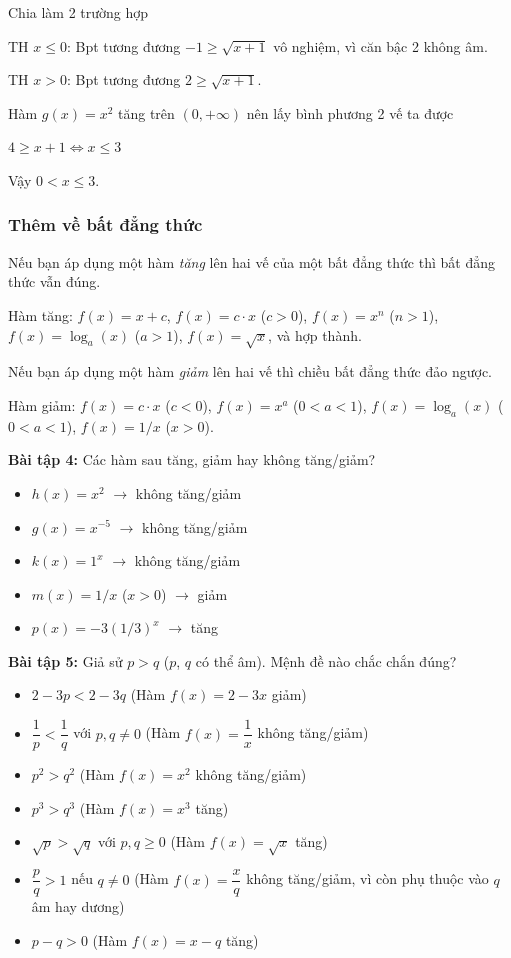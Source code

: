 \documentclass[12pt,a4paper]{article}
\begin{document}
Chia làm 2 trường hợp

TH $x \le 0$: Bpt tương đương $-1 \ge \sqrt{x + 1}$ vô nghiệm, vì căn bậc 2 không âm.

TH $x > 0$: Bpt tương đương $2 \ge \sqrt{x + 1}$.

Hàm $g(x) = x^2$ tăng trên $(0, +\infty)$ nên lấy bình phương 2 vế ta được

$4 \ge x + 1 \Leftrightarrow x \le 3$

Vậy $0 < x \le 3$.

\subsubsection*{Thêm về bất đẳng thức}

Nếu bạn áp dụng một hàm \emph{tăng} lên hai vế của một bất đẳng thức thì bất đẳng thức vẫn đúng.

Hàm tăng: $f(x) = x + c$, $f(x) = c\cdot x$ ($c > 0$), $f(x) = x^n$ ($n > 1$), $f(x) = \log_a(x)$ ($a > 1$), $f(x) = \sqrt{x}$, và hợp thành.

Nếu bạn áp dụng một hàm \emph{giảm} lên hai vế thì chiều bất đẳng thức đảo ngược.

Hàm giảm: $f(x) = c\cdot x$ ($c < 0$), $f(x) = x^a$ ($0 < a < 1$), $f(x) = \log_a(x)$ ($0 < a < 1$), $f(x) = 1/x$ ($x > 0$).

\textbf{Bài tập 4:} Các hàm sau tăng, giảm hay không tăng/giảm?
\begin{itemize}
\item $h(x) = x^2$ $\to$ không tăng/giảm
\item $g(x) = x^{-5}$ $\to$ không tăng/giảm
\item $k(x) = 1^x$ $\to$ không tăng/giảm
\item $m(x) = 1/x$ ($x > 0$) $\to$ giảm
\item $p(x) = -3(1/3)^x$ $\to$ tăng
\end{itemize}

\textbf{Bài tập 5:} Giả sử $p > q$ ($p$, $q$ có thể âm). Mệnh đề nào chắc chắn đúng?
\begin{itemize}
\item[\checkmark] $2 - 3p < 2 - 3q$ (Hàm $f(x) = 2-3x$ giảm)
\item[$\square$] $\dfrac{1}{p} < \dfrac{1}{q}$ với $p,q \neq 0$ (Hàm $f(x) = \dfrac{1}{x}$ không tăng/giảm)
\item[$\square$] $p^2 > q^2$ (Hàm $f(x) = x^2$ không tăng/giảm)
\item[\checkmark] $p^3 > q^3$ (Hàm $f(x) = x^3$ tăng)
\item[\checkmark] $\sqrt{p} > \sqrt{q}$ với $p,q \ge 0$ (Hàm $f(x) = \sqrt{x}$ tăng)
\item[$\square$] $\dfrac{p}{q} > 1$ nếu $q \neq 0$ (Hàm $f(x) = \dfrac{x}{q}$ không tăng/giảm, vì còn phụ thuộc vào $q$ âm hay dương)
\item[\checkmark] $p - q > 0$ (Hàm $f(x) = x - q$ tăng)
\end{itemize}
\end{document}
